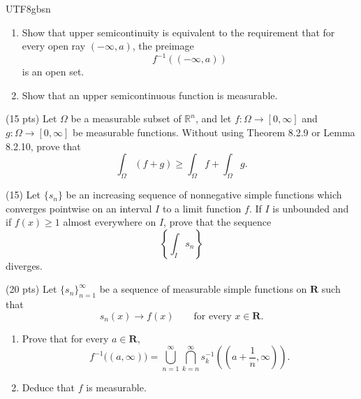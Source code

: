 \documentclass[addpoints]{exam}
\theoremstyle{definition}
\begin{document}
\begin{CJK*}{UTF8}{gbsn}
\begin{questions}
\begin{enumerate}
    \item[(b)] Show that upper semicontinuity is equivalent to the requirement that for every open ray \((-\infty,a)\), the preimage
    \[
    f^{-1}((-\infty,a))
    \]
    is an open set.
     \item[(c)] Show that an upper semicontinuous function is measurable.
    
\end{enumerate}


\begin{solution} 

\end{solution}

\question (15 pts)  Let $\Omega$ be a measurable subset of $\mathbb{R}^n$, and let $f:\Omega\to[0,\infty]$ and $g:\Omega\to[0,\infty]$ be measurable functions.
Without using Theorem 8.2.9 or Lemma 8.2.10, prove that
$$
\int_\Omega (f+g)\ge \int_\Omega f + \int_\Omega g.
$$

\begin{solution} 
 
 \end{solution}
 
 
\question (15) Let \(\{s_n\}\) be an increasing sequence of nonnegative simple functions which converges pointwise on an interval \(I\) to a limit function \(f\). If \(I\) is unbounded and if \(f(x)\ge 1\) almost everywhere on \(I\), prove that the sequence
\[
\left\{\int_I s_n\right\}
\] diverges.

\begin{solution} 
 
 \end{solution}



\question (20 pts)
Let \(\{s_n\}_{n=1}^\infty\) be a sequence of measurable simple functions on \(\mathbf{R}\) such that
\[
s_n(x)\to f(x)\qquad \text{for every }x\in \mathbf{R}.
\]
\begin{enumerate}
    \item[(a)] Prove that for every \(a\in \mathbf{R}\),
    \[
    f^{-1}\bigl((a,\infty)\bigr)
    =
    \bigcup_{n=1}^\infty \bigcap_{k=n}^\infty
    s_k^{-1}\!\left(\left(a+\frac1n,\infty\right)\right).
    \]
    
    \item[(b)] Deduce that \(f\) is measurable.
\end{enumerate}


   
\begin{solution} 
 
 \end{solution}



\end{questions}
\end{CJK*}
\end{document}
